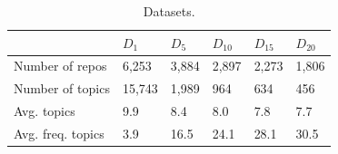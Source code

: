 %


\begin{table}[h!]
	\caption{Datasets.}
	\begin{tabular}{|l|p{0.68cm}|p{0.68cm}|p{0.68cm}|p{0.68cm}|p{0.68cm}|} \hline
		 & $D_{1}$ & $D_{5}$ & $D_{10}$ & $D_{15}$ & $D_{20}$ \\ \hline
		Number of repos & 6,253 & 3,884 & 2,897  & 2,273 & 1,806  \\ \hline
		Number of topics & 15,743 & 1,989 & 964 & 634 & 456 \\ \hline
		Avg. topics & 9.9 & 8.4 & 8.0  & 7.8 & 7.7 \\ \hline
		Avg. freq. topics & 3.9  & 16.5  & 24.1  & 28.1  & 30.5  \\ \hline
	\end{tabular}	
	\label{tab:Datasets}	
\end{table}



